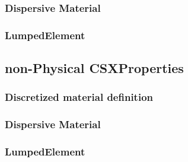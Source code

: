 \subsubsection{Dispersive Material}
\subsubsection{LumpedElement}
 
\subsection{non-Physical CSXProperties}
\subsubsection{Discretized material definition} 
\subsubsection{Dispersive Material}
\subsubsection{LumpedElement}